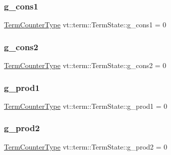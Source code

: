 \subsubsection{\texorpdfstring{g\+\_\+cons1}{g\_cons1}}
{\footnotesize\ttfamily \hyperlink{namespacevt_1_1term_a4fd378cdb0c36683afc1b3399d685f7f}{Term\+Counter\+Type} vt\+::term\+::\+Term\+State\+::g\+\_\+cons1 = 0}

\mbox{\label{structvt_1_1term_1_1_term_state_aaaf3c5cec9c925c420082bb284a5a78e}} 
\subsubsection{\texorpdfstring{g\+\_\+cons2}{g\_cons2}}
{\footnotesize\ttfamily \hyperlink{namespacevt_1_1term_a4fd378cdb0c36683afc1b3399d685f7f}{Term\+Counter\+Type} vt\+::term\+::\+Term\+State\+::g\+\_\+cons2 = 0}

\mbox{\label{structvt_1_1term_1_1_term_state_a75ab01f0dcceb86687a3e26edada0620}} 
\subsubsection{\texorpdfstring{g\+\_\+prod1}{g\_prod1}}
{\footnotesize\ttfamily \hyperlink{namespacevt_1_1term_a4fd378cdb0c36683afc1b3399d685f7f}{Term\+Counter\+Type} vt\+::term\+::\+Term\+State\+::g\+\_\+prod1 = 0}

\mbox{\label{structvt_1_1term_1_1_term_state_a5e7029af1dca0645c92f5a00316dc039}} 
\subsubsection{\texorpdfstring{g\+\_\+prod2}{g\_prod2}}
{\footnotesize\ttfamily \hyperlink{namespacevt_1_1term_a4fd378cdb0c36683afc1b3399d685f7f}{Term\+Counter\+Type} vt\+::term\+::\+Term\+State\+::g\+\_\+prod2 = 0}

